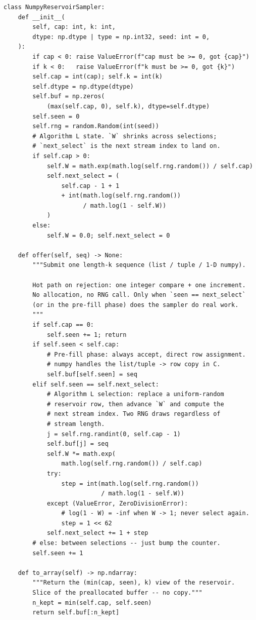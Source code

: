 \documentclass[11pt]{article}
\begin{document}
\begin{lstlisting}[style=pythonstyle]
class NumpyReservoirSampler:
    def __init__(
        self, cap: int, k: int,
        dtype: np.dtype | type = np.int32, seed: int = 0,
    ):
        if cap < 0: raise ValueError(f"cap must be >= 0, got {cap}")
        if k < 0:   raise ValueError(f"k must be >= 0, got {k}")
        self.cap = int(cap); self.k = int(k)
        self.dtype = np.dtype(dtype)
        self.buf = np.zeros(
            (max(self.cap, 0), self.k), dtype=self.dtype)
        self.seen = 0
        self.rng = random.Random(int(seed))
        # Algorithm L state. `W` shrinks across selections;
        # `next_select` is the next stream index to land on.
        if self.cap > 0:
            self.W = math.exp(math.log(self.rng.random()) / self.cap)
            self.next_select = (
                self.cap - 1 + 1
                + int(math.log(self.rng.random())
                      / math.log(1 - self.W))
            )
        else:
            self.W = 0.0; self.next_select = 0

    def offer(self, seq) -> None:
        """Submit one length-k sequence (list / tuple / 1-D numpy).

        Hot path on rejection: one integer compare + one increment.
        No allocation, no RNG call. Only when `seen == next_select`
        (or in the pre-fill phase) does the sampler do real work.
        """
        if self.cap == 0:
            self.seen += 1; return
        if self.seen < self.cap:
            # Pre-fill phase: always accept, direct row assignment.
            # numpy handles the list/tuple -> row copy in C.
            self.buf[self.seen] = seq
        elif self.seen == self.next_select:
            # Algorithm L selection: replace a uniform-random
            # reservoir row, then advance `W` and compute the
            # next stream index. Two RNG draws regardless of
            # stream length.
            j = self.rng.randint(0, self.cap - 1)
            self.buf[j] = seq
            self.W *= math.exp(
                math.log(self.rng.random()) / self.cap)
            try:
                step = int(math.log(self.rng.random())
                           / math.log(1 - self.W))
            except (ValueError, ZeroDivisionError):
                # log(1 - W) = -inf when W -> 1; never select again.
                step = 1 << 62
            self.next_select += 1 + step
        # else: between selections -- just bump the counter.
        self.seen += 1

    def to_array(self) -> np.ndarray:
        """Return the (min(cap, seen), k) view of the reservoir.
        Slice of the preallocated buffer -- no copy."""
        n_kept = min(self.cap, self.seen)
        return self.buf[:n_kept]
\end{lstlisting}
\end{document}
